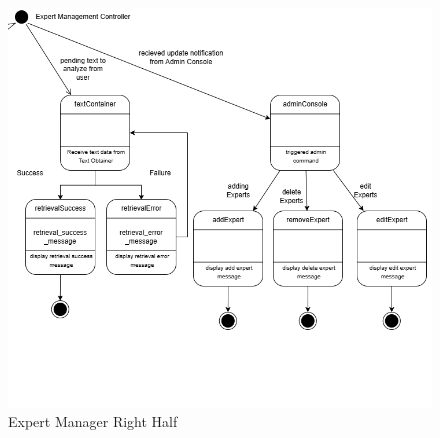 \begin{figure}[H]
	\centering
	\includegraphics[width=\textwidth, height=\textheight, keepaspectratio]{Section2/images/Expert_Manager_state_diagramV3_right_half.png}
	\caption{Expert Manager Right Half}
	\label{ExpertManagerp1}
\end{figure}